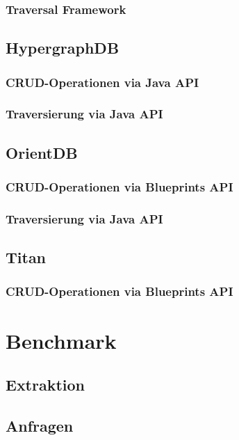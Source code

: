 \subsubsection{Traversal Framework}
\label{anh:neo4j_traversal_framework}

\subsection{HypergraphDB}

\subsubsection{CRUD-Operationen via Java API}

\subsubsection{Traversierung via Java API}

\subsection{OrientDB}

\subsubsection{CRUD-Operationen via Blueprints API}
\label{anh:orientdb_blueprints_api}

\subsubsection{Traversierung via Java API}
\label{anh:orientdb_traverse_java}

\subsection*{Titan}

\subsubsection{CRUD-Operationen via Blueprints API}
\label{anh:titan_blueprints_api}

\section{Benchmark}

\subsection{Extraktion}
\label{anh:extraction}

\subsection{Anfragen}
\label{anh:queries}

